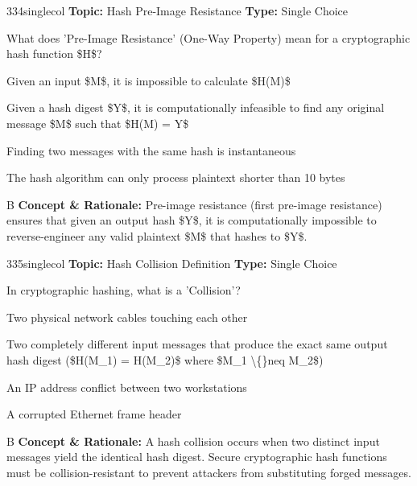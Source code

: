 \begin{qcard}{334}{singlecol}
\textcolor{darkslate!75}{\small\textbf{Topic:} Hash Pre-Image Resistance \hfill \textbf{Type:} Single Choice}\vspace{0.4em}\par
What does 'Pre-Image Resistance' (One-Way Property) mean for a cryptographic hash function \$H\$?
\begin{qoptions}
\item Given an input \$M\$, it is impossible to calculate \$H(M)\$
\item Given a hash digest \$Y\$, it is computationally infeasible to find any original message \$M\$ such that \$H(M) = Y\$
\item Finding two messages with the same hash is instantaneous
\item The hash algorithm can only process plaintext shorter than 10 bytes
\end{qoptions}
\end{qcard}
\nopagebreak
\begin{explainbox}{B}
\textbf{Concept \& Rationale:} Pre-image resistance (first pre-image resistance) ensures that given an output hash \$Y\$, it is computationally impossible to reverse-engineer any valid plaintext \$M\$ that hashes to \$Y\$.
\end{explainbox}

\begin{qcard}{335}{singlecol}
\textcolor{darkslate!75}{\small\textbf{Topic:} Hash Collision Definition \hfill \textbf{Type:} Single Choice}\vspace{0.4em}\par
In cryptographic hashing, what is a 'Collision'?
\begin{qoptions}
\item Two physical network cables touching each other
\item Two completely different input messages that produce the exact same output hash digest (\$H(M\_1) = H(M\_2)\$ where \$M\_1 \textbackslash\{\}neq M\_2\$)
\item An IP address conflict between two workstations
\item A corrupted Ethernet frame header
\end{qoptions}
\end{qcard}
\nopagebreak
\begin{explainbox}{B}
\textbf{Concept \& Rationale:} A hash collision occurs when two distinct input messages yield the identical hash digest. Secure cryptographic hash functions must be collision-resistant to prevent attackers from substituting forged messages.
\end{explainbox}

